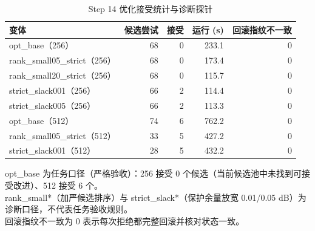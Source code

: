 \begin{table}[htbp]
  \centering
  \caption{Step 14 优化接受统计与诊断探针}
  \label{tab:step14-optimize}
  \begin{tabular}{lrrrr}
    \toprule
    变体 & 候选尝试 & 接受 & 运行 (s) & 回滚指纹不一致 \\
    \midrule
    opt\_base（256） & 68 & 0 & 233.1 & 0 \\
    rank\_small05\_strict（256） & 68 & 0 & 173.4 & 0 \\
    rank\_small20\_strict（256） & 68 & 0 & 115.7 & 0 \\
    strict\_slack001（256） & 66 & 2 & 114.4 & 0 \\
    strict\_slack005（256） & 66 & 2 & 113.3 & 0 \\
    \midrule
    opt\_base（512） & 74 & 6 & 762.2 & 0 \\
    rank\_small05\_strict（512） & 33 & 5 & 427.2 & 0 \\
    strict\_slack001（512） & 28 & 5 & 432.2 & 0 \\
    \bottomrule
  \end{tabular}
  \par\vspace{2pt}
  \begin{flushleft}\footnotesize
  opt\_base 为任务口径（严格验收）：256 接受 0 个候选（当前候选池中未找到可接受改进）、512 接受 6 个。 \\
  rank\_small*（加严候选排序）与 strict\_slack*（保护余量放宽 0.01/0.05 dB）为诊断口径，不代表任务验收规则。 \\
  回滚指纹不一致为 0 表示每次拒绝都完整回滚并核对状态一致。 \\
  \end{flushleft}
\end{table}
